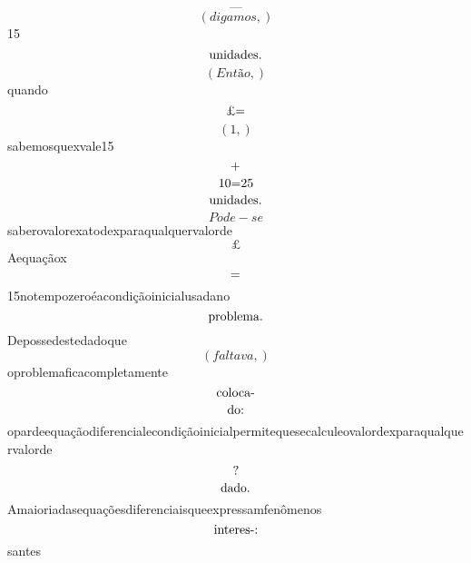 \documentclass{article}
\begin{document}
\begin{equation}
—
\end{equation}\begin{equation}
\left( digamos,\right)
\end{equation}15\begin{equation}
$unidades.$
\end{equation}\begin{equation}
\left( Então,\right)
\end{equation}quando\begin{equation}
$£=$
\end{equation}\begin{equation}
\left( 1,\right)
\end{equation}sabemosquexvale15\begin{equation}
$+$
\end{equation}\begin{equation}
$10=25$
\end{equation}\begin{equation}
$unidades.$
\end{equation}\begin{equation}
Pode - se
\end{equation}saberovalorexatodexparaqualquervalorde\begin{equation}
£
\end{equation}Aequaçãox\begin{equation}
$=$
\end{equation}15notempozeroéacondiçãoinicialusadano\begin{equation}
$problema.$
\end{equation}Depossedestedadoque\begin{equation}
\left( faltava,\right)
\end{equation}oproblemaficacompletamente\begin{equation}
$coloca-$
\end{equation}\begin{equation}
$do:$
\end{equation}opardeequaçãodiferencialecondiçãoinicialpermitequesecalculeovalordexparaqualquervalorde\begin{equation}
$?$
\end{equation}\begin{equation}
$dado.$
\end{equation}Amaioriadasequaçõesdiferenciaisqueexpressamfenômenos\begin{equation}
$interes-:$
\end{equation}santes\begin{equation}

\end{equation}
\end{document}
